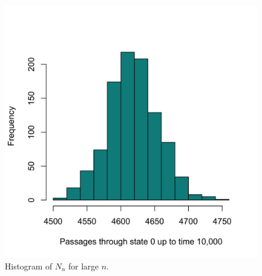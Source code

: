 \documentclass[letterpaper, 10 pt, conference]{article}
\begin{document}
\begin{figure}
\centering
\includegraphics[width =.5\linewidth]{hist}
\caption{Histogram of $N_n$ for large $n$.}
\label{fig:hist}
\end{figure}
\end{document}
